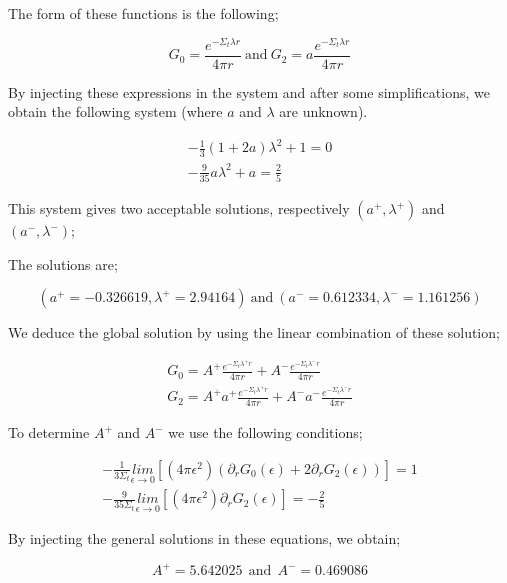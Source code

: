 \documentclass[a4paper, 12pt]{report}
\begin{document}
The form of these functions is the following;

\begin{equation}
G_0 = \frac{e^{-\Sigma_t \lambda r}}{4\pi r} \ \text{and} \ G_2 = a\frac{e^{-\Sigma_t \lambda r}}{4\pi r}
\end{equation}

By injecting these expressions in the system and after some simplifications, we obtain the following system (where $a$ and $\lambda$ are unknown).

\begin{align}
-\frac{1}{3}(1+2a)\lambda^2 + 1 = 0 \\
-\frac{9}{35}a\lambda^2 + a = \frac{2}{5}
\end{align}

This system gives two acceptable solutions, respectively $(a^+,\lambda^+)$ and $(a^-,\lambda^-)$;

The solutions are;

\begin{equation}
(a^+ = -0.326619,\lambda^+ = 2.94164) \ \text{and} \ (a^- = 0.612334,\lambda^- = 1.161256)
\end{equation}

We deduce the global solution by using the linear combination of these solution;

\begin{align}
G_0 = A^+\frac{e^{-\Sigma_t \lambda^+ r}}{4\pi r} + A^- \frac{e^{-\Sigma_t \lambda^- r}}{4\pi r} \\
G_2 = A^+a^+\frac{e^{-\Sigma_t \lambda^+ r}}{4\pi r} + A^-a^-\frac{e^{-\Sigma_t \lambda^- r}}{4\pi r}
\end{align} 

To determine $A^+$ and $A^-$ we use the following conditions;

\begin{align}
-\frac{1}{3\Sigma_t} \underset{\epsilon \rightarrow 0}{lim}\left[ (4\pi \epsilon^2) \left( \partial_r G_0(\epsilon) + 2\partial_r G_2(\epsilon) \right)\right] = 1 \\
 -\frac{9}{35\Sigma_t} \underset{\epsilon \rightarrow 0}{lim}\left[ (4\pi \epsilon^2) \partial_r G_2(\epsilon) \right] = -\frac{2}{5}
\end{align}

By injecting the general solutions in these equations, we obtain;

\begin{equation}
A^+ = 5.642025\ \ \text{and}\ \ A^- = 0.469086 
\end{equation}
\end{document}
